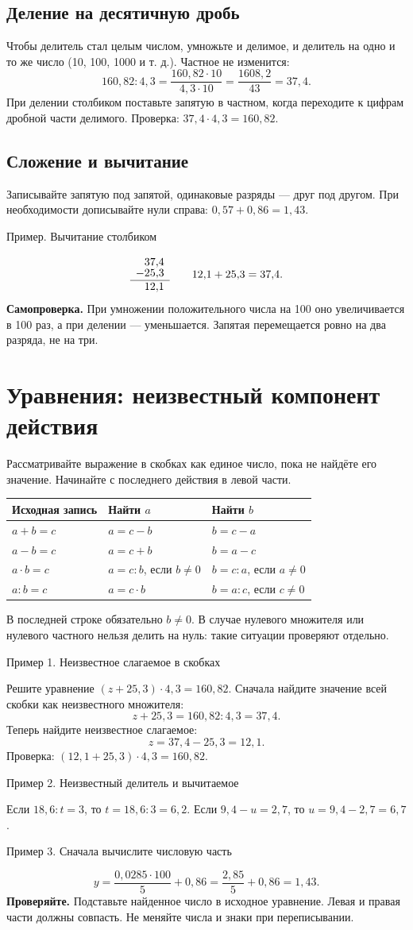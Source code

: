 \documentclass[a4paper,12pt]{article}
\newcommand{\idea}[1]{\textcolor{darkaccent}{\textbf{#1}}}
\newcommand{\ex}[1]{\par\medskip\textcolor{darkaccent}{#1}\par\smallskip}
\begin{document}
\subsection{Деление на десятичную дробь}
Чтобы делитель стал целым числом, умножьте и делимое, и делитель на одно и то же число (10, 100, 1000 и т. д.). Частное не изменится:
\[
160{,}82:4{,}3=\frac{160{,}82\cdot10}{4{,}3\cdot10}
=\frac{1608{,}2}{43}=37{,}4.
\]
При делении столбиком поставьте запятую в частном, когда переходите к цифрам дробной части делимого. Проверка: $37{,}4\cdot4{,}3=160{,}82$.
\subsection{Сложение и вычитание}
Записывайте запятую под запятой, одинаковые разряды --- друг под другом. При необходимости дописывайте нули справа: $0{,}57+0{,}86=1{,}43$.
\ex{Пример. Вычитание столбиком}
\[
\begin{array}{r@{}l}
 &37{,}4\\[-2pt]
-&25{,}3\\\hline
 &12{,}1
\end{array}
\qquad 12{,}1+25{,}3=37{,}4.
\]
\idea{Самопроверка.} При умножении положительного числа на 100 оно увеличивается в 100 раз, а при делении --- уменьшается. Запятая перемещается ровно на два разряда, не на три.
\clearpage
\section{Уравнения: неизвестный компонент действия}
Рассматривайте выражение в скобках как единое число, пока не найдёте его значение. Начинайте с последнего действия в левой части.
\begin{center}
\renewcommand{\arraystretch}{1.35}
\begin{tabularx}{\linewidth}{lXX}
\toprule
Исходная запись & Найти $a$ & Найти $b$\\\midrule
$a+b=c$ & $a=c-b$ & $b=c-a$\\
$a-b=c$ & $a=c+b$ & $b=a-c$\\
$a\cdot b=c$ & $a=c:b$, если $b\ne0$ & $b=c:a$, если $a\ne0$\\
$a:b=c$ & $a=c\cdot b$ & $b=a:c$, если $c\ne0$\\\bottomrule
\end{tabularx}
\end{center}
В последней строке обязательно $b\ne0$. В случае нулевого множителя или нулевого частного нельзя делить на нуль: такие ситуации проверяют отдельно.
\ex{Пример 1. Неизвестное слагаемое в скобках}
Решите уравнение $(z+25{,}3)\cdot4{,}3=160{,}82$.
Сначала найдите значение всей скобки как неизвестного множителя:
\[
z+25{,}3=160{,}82:4{,}3=37{,}4.
\]
Теперь найдите неизвестное слагаемое:
\[
z=37{,}4-25{,}3=12{,}1.
\]
Проверка: $(12{,}1+25{,}3)\cdot4{,}3=160{,}82$.
\ex{Пример 2. Неизвестный делитель и вычитаемое}
Если $18{,}6:t=3$, то $t=18{,}6:3=6{,}2$.
Если $9{,}4-u=2{,}7$, то $u=9{,}4-2{,}7=6{,}7$.
\ex{Пример 3. Сначала вычислите числовую часть}
\[
y=\frac{0{,}0285\cdot100}{5}+0{,}86
=\frac{2{,}85}{5}+0{,}86=1{,}43.
\]
\idea{Проверяйте.} Подставьте найденное число в исходное уравнение. Левая и правая части должны совпасть. Не меняйте числа и знаки при переписывании.
\clearpage
\end{document}
